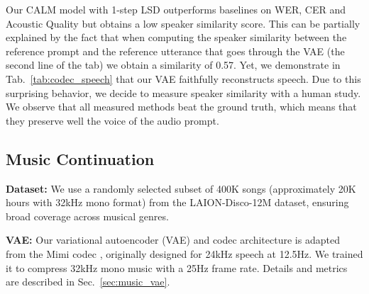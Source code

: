 Our CALM model with 1-step LSD \citep{lsd} outperforms baselines on WER, CER and Acoustic Quality but obtains a low speaker similarity score. This can be partially explained by the fact that when computing the speaker similarity between the reference prompt and the reference utterance that goes through the VAE (the second line of the tab) we obtain a similarity of 0.57. Yet, we demonstrate in Tab.~\ref{tab:codec_speech} that our VAE faithfully reconstructs speech. Due to this surprising behavior, we decide to measure speaker similarity with a human study. We observe that all measured methods beat the ground truth, which means that they preserve well the voice of the audio prompt.

\subsection{Music Continuation}
\label{sec:music_continuation_exp}

\noindent\textbf{Dataset:}
We use a randomly selected subset of 400K songs (approximately 20K hours with 32kHz mono format) from the LAION-Disco-12M dataset, ensuring broad coverage across musical genres. 

\noindent\textbf{VAE:}
Our variational autoencoder (VAE) and codec architecture is adapted from the Mimi codec \citep{moshi}, originally designed for 24kHz speech at 12.5Hz. We trained it to compress 32kHz mono music with a 25Hz frame rate. Details and metrics are described in Sec.~\ref{sec:music_vae}.

